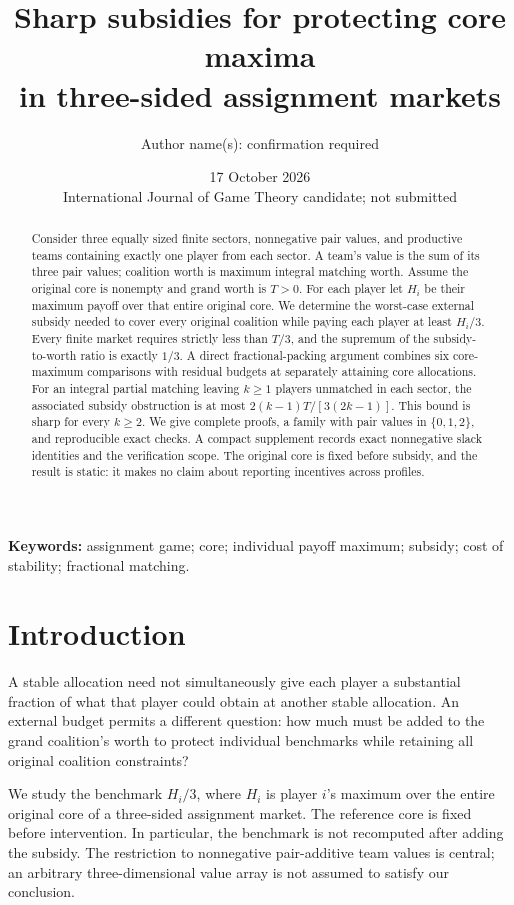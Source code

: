 \documentclass[11pt]{article}
\title{Sharp subsidies for protecting core maxima\\in three-sided assignment markets}
\author{Author name(s): confirmation required}
\date{17 October 2026\\[3pt]\small International Journal of Game Theory candidate; not submitted}
\theoremstyle{remark}
\begin{document}
\maketitle

\begin{abstract}
Consider three equally sized finite sectors, nonnegative pair values, and
productive teams containing exactly one player from each sector. A team's
value is the sum of its three pair values; coalition worth is maximum integral
matching worth. Assume the original core is nonempty and grand worth is
$T>0$. For each player let $H_i$ be their maximum payoff over that entire
original core. We determine the worst-case external subsidy needed to cover
every original coalition while paying each player at least $H_i/3$.
Every finite market requires strictly less than $T/3$, and the supremum of
the subsidy-to-worth ratio is exactly $1/3$. A direct fractional-packing
argument combines six core-maximum comparisons with residual budgets at
separately attaining core allocations. For an integral partial matching
leaving $k\ge1$ players unmatched in each sector, the associated subsidy
obstruction is at most $2(k-1)T/[3(2k-1)]$. This bound is sharp for every
$k\ge2$. We give complete proofs, a family with pair values in
$\{0,1,2\}$, and reproducible exact checks. A compact supplement records exact nonnegative slack identities and the
verification scope. The original core is fixed before subsidy, and the result
is static: it makes no claim about reporting incentives across profiles.
\end{abstract}
\noindent\textbf{Keywords:} assignment game; core; individual payoff maximum;
subsidy; cost of stability; fractional matching.

\section{Introduction}
A stable allocation need not simultaneously give each player a substantial
fraction of what that player could obtain at another stable allocation.
An external budget permits a different question: how much must be added to
the grand coalition's worth to protect individual benchmarks while retaining
all original coalition constraints?

We study the benchmark $H_i/3$, where $H_i$ is player $i$'s maximum over the
entire original core of a three-sided assignment market. The reference core
is fixed before intervention. In particular, the benchmark is not recomputed
after adding the subsidy. The restriction to nonnegative pair-additive team
values is central; an arbitrary three-dimensional value array is not assumed
to satisfy our conclusion.
\end{document}
